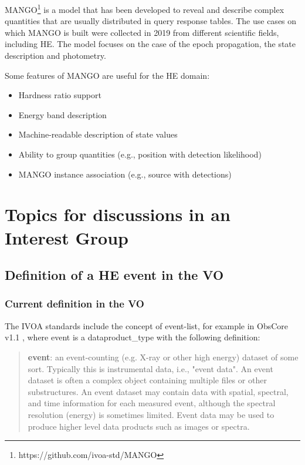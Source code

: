\documentclass[11pt,a4paper]{ivoa}
\begin{document}
{MANGO\footnote{https://github.com/ivoa-std/MANGO} is a model that has been developed to reveal
and describe complex quantities that are usually distributed in query response tables.
The use cases on which MANGO is built were collected in 2019 from different scientific fields, including \gls{HE}.
The model focuses on the case of the epoch propagation, the state description and photometry.

Some features of MANGO are useful for the \gls{HE} domain:
 \begin{itemize}
     \item Hardness ratio support
     \item Energy band description
     \item Machine-readable description of state values
     \item Ability to group quantities (e.g., position with detection likelihood)
     \item MANGO instance association (e.g., source with detections)
\end{itemize}


\section{Topics for discussions in an Interest Group}

\subsection{Definition of a HE event in the VO}
\label{sec:event-bundlle-or-list}

\subsubsection{Current definition in the VO}

The \gls{IVOA} standards include the concept of event-list, for example in ObsCore v1.1 \citep{2017ivoa.spec.0509L}, where
event is a dataproduct\_type with the following definition:
\begin{quote}
    \textbf{event}: an event-counting (e.g. X-ray or other high energy) dataset of some sort. Typically this is
    instrumental data, i.e., "event data". An event dataset is often a complex object containing multiple files or
    other substructures. An event dataset may contain data with spatial, spectral, and time information for each
    measured event, although the spectral resolution (energy) is sometimes limited. Event data may be used to produce
    higher level data products such as images or spectra.
\end{quote}

}
\end{document}
